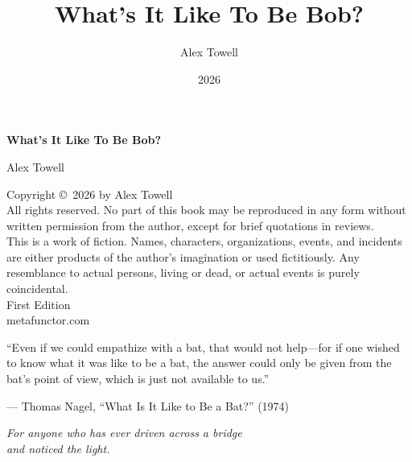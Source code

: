 \documentclass[12pt,letterpaper,oneside]{book}
\title{What's It Like To Be Bob?}
\author{Alex Towell}
\date{2026}
\renewcommand{\_}{\textunderscore\allowbreak}
\begin{document}
\frontmatter

\begin{titlepage}
\centering
\vspace*{3in}
{\Huge\bfseries What's It Like To Be Bob?\par}
\vspace{0.5in}
{\Large Alex Towell\par}
\vfill
\end{titlepage}

\thispagestyle{empty}
\vspace*{\fill}
\begin{center}
Copyright \copyright\ 2026 by Alex Towell\\[1em]
All rights reserved. No part of this book may be reproduced in any form
without written permission from the author, except for brief quotations
in reviews.\\[2em]
This is a work of fiction. Names, characters, organizations, events, and
incidents are either products of the author's imagination or used
fictitiously. Any resemblance to actual persons, living or dead, or
actual events is purely coincidental.\\[2em]
First Edition\\[1em]
metafunctor.com
\end{center}
\vspace*{\fill}
\cleardoublepage

\thispagestyle{empty}
\vspace*{\fill}
\epigraph{``Even if we could empathize with a bat, that would not help---for if one wished to know what it was like to be a bat, the answer could only be given from the bat's point of view, which is just not available to us.''}{--- Thomas Nagel, ``What Is It Like to Be a Bat?'' (1974)}
\vspace*{\fill}
\cleardoublepage

\thispagestyle{empty}
\vspace*{3in}
\begin{center}
\textit{For anyone who has ever driven across a bridge\\and noticed the light.}
\end{center}
\vfill
\cleardoublepage

\tableofcontents
\cleardoublepage

\mainmatter











\backmatter





\end{document}
